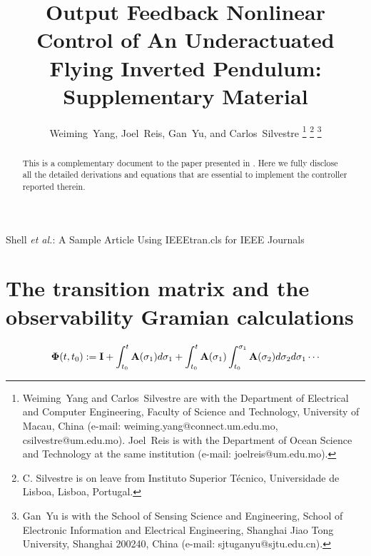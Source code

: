 \documentclass[journal,onecolumn]{IEEEtran}
\begin{document}
\title{Output Feedback Nonlinear Control of An Underactuated  Flying Inverted Pendulum: Supplementary Material}

\author{Weiming~Yang,
		Joel~Reis,
        Gan~Yu, and 
        Carlos~Silvestre
	\thanks{Weiming~Yang and Carlos~Silvestre are with the Department of Electrical and Computer Engineering, Faculty of Science and Technology, University of Macau, China (e-mail: weiming.yang@connect.um.edu.mo, csilvestre@um.edu.mo).
		Joel~Reis is with the Department of Ocean Science and Technology at the same institution (e-mail: joelreis@um.edu.mo).}
	\thanks{C. Silvestre is on leave from Instituto Superior Técnico, Universidade de Lisboa, Lisboa, Portugal.}
	\thanks{Gan~Yu is with the School of Sensing Science and Engineering, School of Electronic Information and Electrical Engineering, Shanghai Jiao Tong University, Shanghai 200240, China (e-mail: sjtuganyu@sjtu.edu.cn).}
}

%
{Shell \MakeLowercase{\textit{et al.}}: A Sample Article Using IEEEtran.cls for IEEE Journals}

\maketitle

\begin{abstract}
	This is a complementary document to the paper presented in \cite{2023_Yang_Automatica}.
	Here we fully disclose all the detailed derivations and equations that are essential to implement the controller reported therein.
\end{abstract}

\section{The transition matrix and the observability Gramian calculations}

	\begin{align}
	\boldsymbol{\Phi}(t,t_0):= {\mathbf I} + \int_{t_0}^t{\mathbf A}(\sigma_1)d\sigma_1 + \int_{t_0}^t{\mathbf A}(\sigma_1)\int_{t_0}^{\sigma_1}{\mathbf A}(\sigma_2)d\sigma_2d\sigma_1 \cdots
	\label{def:Phi_t_t0}
\end{align}
\end{document}
